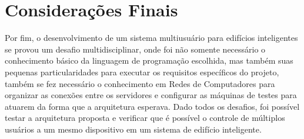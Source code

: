 \section{Considerações Finais}
Por fim, o desenvolvimento de um sistema multiusuário para edifícios inteligentes se provou um desafio multidisciplinar,
onde foi não somente necessário o conhecimento básico da linguagem de programação escolhida, mas também suas pequenas
particularidades para executar os requisitos específicos do projeto, também se fez necessário o conhecimento em Redes de Computadores 
para organizar as conexões entre os servidores e configurar as máquinas de testes para atuarem da forma que a arquitetura esperava.
Dado todos os desafios, foi possível testar a arquitetura proposta e verificar que é possível o controle de múltiplos usuários
a um mesmo dispositivo em um sistema de edifício inteligente.